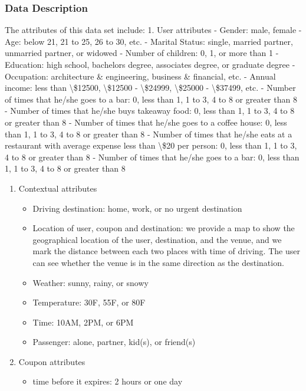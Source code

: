 \documentclass[11pt]{article}
\providecommand{\tightlist}{%
      \setlength{\itemsep}{0pt}\setlength{\parskip}{0pt}}
\begin{document}
    \subsubsection{Data Description}\label{data-description}

The attributes of this data set include: 1. User attributes - Gender:
male, female - Age: below 21, 21 to 25, 26 to 30, etc. - Marital Status:
single, married partner, unmarried partner, or widowed - Number of
children: 0, 1, or more than 1 - Education: high school, bachelors
degree, associates degree, or graduate degree - Occupation: architecture
\& engineering, business \& financial, etc. - Annual income: less than
\textbackslash{}\$12500, \textbackslash{}\$12500 -
\textbackslash{}\$24999, \textbackslash{}\$25000 -
\textbackslash{}\$37499, etc. - Number of times that he/she goes to a
bar: 0, less than 1, 1 to 3, 4 to 8 or greater than 8 - Number of times
that he/she buys takeaway food: 0, less than 1, 1 to 3, 4 to 8 or
greater than 8 - Number of times that he/she goes to a coffee house: 0,
less than 1, 1 to 3, 4 to 8 or greater than 8 - Number of times that
he/she eats at a restaurant with average expense less than
\textbackslash{}\$20 per person: 0, less than 1, 1 to 3, 4 to 8 or
greater than 8 - Number of times that he/she goes to a bar: 0, less than
1, 1 to 3, 4 to 8 or greater than 8

\begin{enumerate}
\def\labelenumi{\arabic{enumi}.}
\setcounter{enumi}{1}
\tightlist
\item
  Contextual attributes

  \begin{itemize}
  \tightlist
  \item
    Driving destination: home, work, or no urgent destination
  \item
    Location of user, coupon and destination: we provide a map to show
    the geographical location of the user, destination, and the venue,
    and we mark the distance between each two places with time of
    driving. The user can see whether the venue is in the same direction
    as the destination.
  \item
    Weather: sunny, rainy, or snowy
  \item
    Temperature: 30F, 55F, or 80F
  \item
    Time: 10AM, 2PM, or 6PM
  \item
    Passenger: alone, partner, kid(s), or friend(s)
  \end{itemize}
\item
  Coupon attributes

  \begin{itemize}
  \tightlist
  \item
    time before it expires: 2 hours or one day
  \end{itemize}
\end{enumerate}
\end{document}
